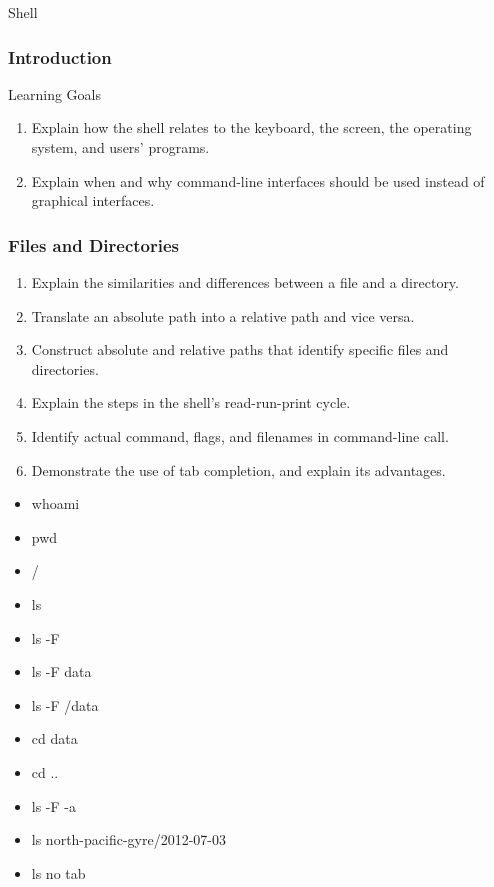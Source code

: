 \documentclass[xcolor=dvipsnames]{beamer}
\begin{document}
\begin{frame}
\begin{center}{\Huge Shell}
\end{center}
\end{frame}

\begin{frame}
\frametitle{Introduction}
Learning Goals
\begin{enumerate}

 \item   Explain how the shell relates to the keyboard, the screen, the operating system, and users' programs.
 \item   Explain when and why command-line interfaces should be used instead of graphical interfaces.

\end{enumerate}

\end{frame}

\begin{frame}
\frametitle{Files and Directories}
\begin{enumerate}
\item    Explain the similarities and differences between a file and a directory.
\item    Translate an absolute path into a relative path and vice versa.
\item    Construct absolute and relative paths that identify specific files and directories.
\item    Explain the steps in the shell's read-run-print cycle.
\item    Identify actual command, flags, and filenames in command-line call.
\item    Demonstrate the use of tab completion, and explain its advantages.
\end{enumerate}

\begin{multicols}{2}
\begin{itemize}
\item whoami
\item pwd
\item /
\item ls
\item ls -F
\item ls -F data
\item ls -F /data
\item cd data
\item cd ..
\item ls -F -a
\item ls north-pacific-gyre/2012-07-03
\item ls no tab
\end{itemize}
\end{multicols}
\end{frame}
\end{document}
